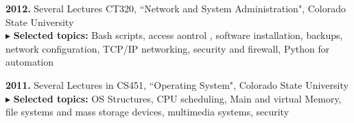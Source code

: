 \begin{cvlist}
     \item \textbf{2012.} Several Lectures CT320, ``Network and System Administration", Colorado State University\\    
    $\blacktriangleright$ \textbf{Selected topics:} Bash scripts, access aontrol ,  software installation, backups, network configuration, TCP/IP networking, security and firewall, Python for automation\\


    \item \textbf{2011.} Several Lectures in CS451, ``Operating System", Colorado State University\\    
    $\blacktriangleright$ \textbf{Selected topics:} OS Structures, CPU scheduling, Main and virtual Memory, file systems and mass storage devices, multimedia systems, security\\
\end{cvlist}

